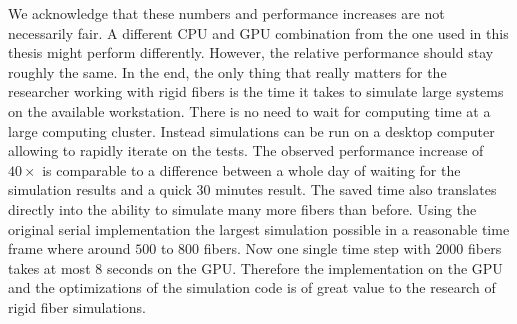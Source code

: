 We acknowledge that these numbers and performance increases are not necessarily fair. A different CPU and GPU combination from the one used in this thesis might perform differently. However, the relative performance should stay roughly the same. In the end, the only thing that really matters for the researcher working with rigid fibers is the time it takes to simulate large systems on the available workstation. There is no need to wait for computing time at a large computing cluster. Instead simulations can be run on a desktop computer allowing to rapidly iterate on the tests. The observed performance increase of $40×$ is comparable to a difference between a whole day of waiting for the simulation results and a quick $30$ minutes result. The saved time also translates directly into the ability to simulate many more fibers than before. Using the original serial implementation the largest simulation possible in a reasonable time frame where around $500$ to $800$ fibers. Now one single time step with $2000$ fibers takes at most $8$ seconds on the GPU. Therefore the implementation on the GPU and the optimizations of the simulation code is of great value to the research of rigid fiber simulations.
